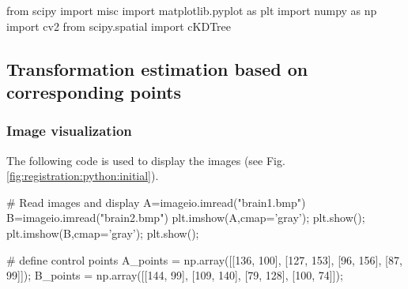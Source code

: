 \def\QRCODE{TB_image_TUT.IMG.image_registration_pythonqrcode.png}
\def\QRPAGE{http://www.iptutorials.science/tree/master/TB_image/TUT.IMG.image_registration/python}

\begin{python}
from scipy import misc
import matplotlib.pyplot as plt
import numpy as np
import cv2
from scipy.spatial import cKDTree
\end{python}


\subsection{Transformation estimation based on corresponding points}
\subsubsection{Image visualization}
The following code is used to display the images (see Fig.\ref{fig:registration:python:initial}).

\begin{python}# Read images and display
A=imageio.imread("brain1.bmp")
B=imageio.imread("brain2.bmp")
plt.imshow(A,cmap='gray');
plt.show();
plt.imshow(B,cmap='gray');
plt.show();

# define control points
A_points = np.array([[136, 100], [127, 153], [96, 156], [87, 99]]);
B_points = np.array([[144, 99], [109, 140], [79, 128], [100, 74]]);
\end{python}

